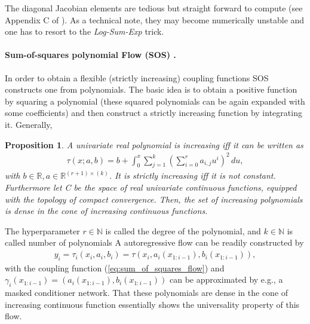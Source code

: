 \documentclass[12pt,a4paper]{article}
\newtheorem{proposition}{Proposition}
\begin{document}
The diagonal Jacobian elements are tedious but straight forward to compute (see Appendix C of \cite{huang_2018_neural_autoregressive_flows}). As a technical note,  they  may become numerically unstable and one has to resort to the \textit{Log-Sum-Exp} trick.


\paragraph{Sum-of-squares polynomial Flow (SOS) \cite{jaini_polynomial_flow_2019}.}
In order to obtain a flexible (strictly increasing) coupling functions  SOS constructs  one from polynomials. The basic idea is to obtain a positive function by squaring a polynomial (these squared polynomials can be again expanded with some coefficients) and then construct a strictly increasing function by integrating it. Generally,
\begin{proposition}{\cite{jaini_polynomial_flow_2019}}
	A univariate real polynomial is increasing iff it can be written as
	\begin{align}\label{eq:sum_of_squares_flow}
		\tau (x; a, b) = b + \int_0^x\sum_{j=1}^k \left(\sum_{i=0}^r a_{i, j} u^i \right) ^2 \, du,
	\end{align}
	with $b\in \mathbb{R},  a\in\mathbb{R}^{(r+1)\times (k)}$. It is strictly increasing iff it is not constant.
	Furthermore let C be the space of real univariate continuous functions, equipped with the topology of compact convergence. Then, the set of increasing polynomials is dense
	in the cone of increasing continuous functions.
\end{proposition}
The hyperparameter $r\in \mathbb{N}$ is called the degree of the polynomial, and $k\in \mathbb{N}$  is called number of polynomials
A autoregressive flow can be readily constructed by
\begin{align}
	y_i = \tau_i(x_i, a_i, b_i) = \tau(x_i, a_i(x_{1:i-1}), b_i(x_{1:i-1})), 
\end{align}
with the coupling function (\ref{eq:sum_of_squares_flow}) and 
$\gamma_i(x_{1:i-1}) = (a_i(x_{1:i-1}), b_i(x_{1:i-1}))$ can be approximated by e.g., a masked conditioner network. 
That these polynomials are dense in the cone of increasing continuous function essentially shows the universality property of this flow. 
\end{document}

